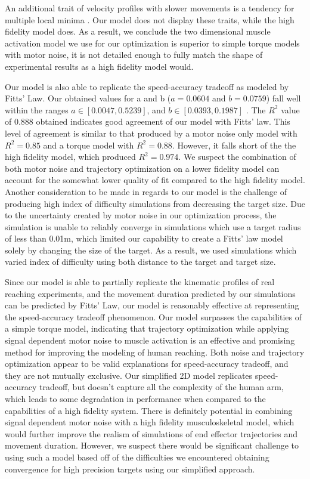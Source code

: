 \documentclass[letterpaper, 10pt, conference]{ieeeconf}
\begin{document}
An additional trait of velocity profiles with slower movements is a tendency for multiple local minima \cite{c11}\cite{c12}. Our model does not display these traits, while the high fidelity model does. As a result, we conclude the two dimensional muscle activation model we use for our optimization is superior to simple torque models with motor noise, it is not detailed enough to fully match the shape of experimental results as a high fidelity model would. 
\par Our model is also able to replicate the speed-accuracy tradeoff as modeled by Fitts' Law. Our obtained values for a and b (\(a = 0.0604\) and \(b = 0.0759\)) fall well within the ranges \(a \in [0.0047, 0.5239]\), and \(b \in [0.0393,0.1987]\) \cite{c13}. The \(R^2\) value of 0.888 obtained indicates good agreement of our model with Fitts' law. This level of agreement is similar to that produced by a motor noise only model with \(R^2 = 0.85\) \cite{c2} and a torque model with \(R^2 = 0.88\)\cite{c5}. However, it falls short of the the high fidelity model, which produced \(R^2 = 0.974\)\cite{c5}. We suspect the combination of both motor noise and trajectory optimization on a lower fidelity model can account for the somewhat lower quality of fit compared to the high fidelity model. Another consideration to be made in regards to our model is the challenge of producing high index of difficulty simulations from decreasing the target size. Due to the uncertainty created by motor noise in our optimization process, the simulation is unable to reliably converge in simulations which use a target radius of less than 0.01m, which limited our capability to create a Fitts' law model solely by changing the size of the target. As a result, we used simulations which varied index of difficulty using both distance to the target and target size. 

\par Since our model is able to partially replicate the kinematic profiles of real reaching experiments, and the movement duration predicted by our simulations can be predicted by Fitts' Law, our model is reasonably effective at representing the speed-accuracy tradeoff phenomenon. Our model surpasses the capabilities of a simple torque model, indicating that trajectory optimization while applying signal dependent motor noise to muscle activation is an effective and promising method for improving the modeling of human reaching. Both noise and trajectory optimization appear to be valid explanations for speed-accuracy tradeoff, and they are not mutually exclusive. Our simplified 2D model replicates speed-accuracy tradeoff, but doesn't capture all the complexity of the human arm, which leads to some degradation in performance when compared to the capabilities of a high fidelity system. There is definitely potential in combining signal dependent motor noise with a high fidelity musculoskeletal model, which would further improve the realism of simulations of end effector trajectories and movement duration. However, we suspect there would be significant challenge to using such a model based off of the difficulties we encountered obtaining convergence for high precision targets using our simplified approach. 
\end{document}
